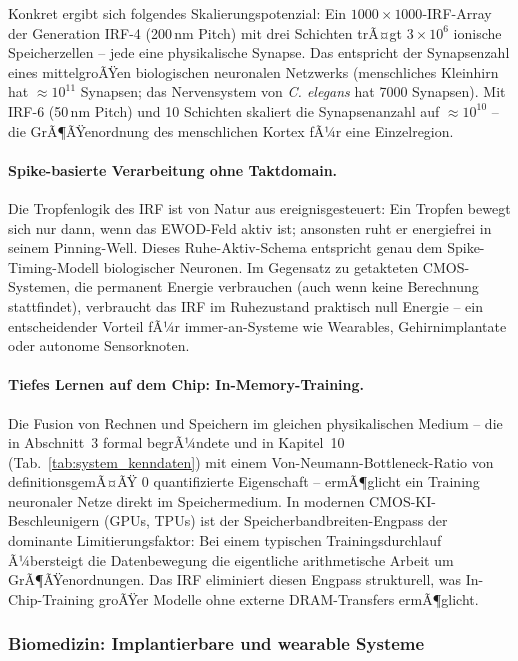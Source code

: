 ﻿\documentclass[a4paper,12pt]{scrreprt}
\theoremstyle{definition}
\begin{document}
Konkret ergibt sich folgendes Skalierungspotenzial: Ein $1000 \times 1000$-IRF-Array
der Generation IRF-4 (200\,nm Pitch) mit drei Schichten trÃ¤gt
$3 \times 10^6$ ionische Speicherzellen -- jede eine physikalische Synapse.
Das entspricht der Synapsenzahl eines mittelgroÃŸen biologischen neuronalen
Netzwerks (menschliches Kleinhirn hat $\approx 10^{11}$ Synapsen; das
Nervensystem von \textit{C. elegans} hat 7000 Synapsen). Mit IRF-6
(50\,nm Pitch) und 10 Schichten skaliert die Synapsenanzahl auf
$\approx 10^{10}$ -- die GrÃ¶ÃŸenordnung des menschlichen Kortex fÃ¼r
eine Einzelregion.

\paragraph{Spike-basierte Verarbeitung ohne Taktdomain.}
Die Tropfenlogik des IRF ist von Natur aus ereignisgesteuert: Ein Tropfen
bewegt sich nur dann, wenn das EWOD-Feld aktiv ist; ansonsten ruht er
energiefrei in seinem Pinning-Well. Dieses Ruhe-Aktiv-Schema entspricht
genau dem Spike-Timing-Modell biologischer Neuronen. Im Gegensatz zu
getakteten CMOS-Systemen, die permanent Energie verbrauchen (auch wenn
keine Berechnung stattfindet), verbraucht das IRF im Ruhezustand
praktisch null Energie -- ein entscheidender Vorteil fÃ¼r immer-an-Systeme
wie Wearables, Gehirnimplantate oder autonome Sensorknoten.

\paragraph{Tiefes Lernen auf dem Chip: In-Memory-Training.}
Die Fusion von Rechnen und Speichern im gleichen physikalischen Medium --
die in Abschnitt~3 formal begrÃ¼ndete und in Kapitel~10 (Tab.~\ref{tab:system_kenndaten})
mit einem Von-Neumann-Bottleneck-Ratio von definitionsgemÃ¤ÃŸ 0 quantifizierte
Eigenschaft -- ermÃ¶glicht ein Training neuronaler Netze direkt im Speichermedium.
In modernen CMOS-KI-Beschleunigern (GPUs, TPUs) ist der Speicherbandbreiten-Engpass
der dominante Limitierungsfaktor: Bei einem typischen Trainingsdurchlauf
Ã¼bersteigt die Datenbewegung die eigentliche arithmetische Arbeit um
GrÃ¶ÃŸenordnungen. Das IRF eliminiert diesen Engpass strukturell, was
In-Chip-Training groÃŸer Modelle ohne externe DRAM-Transfers ermÃ¶glicht.

\subsubsection{Biomedizin: Implantierbare und wearable Systeme}
\label{subsubsec:biomedizin}
\end{document}
